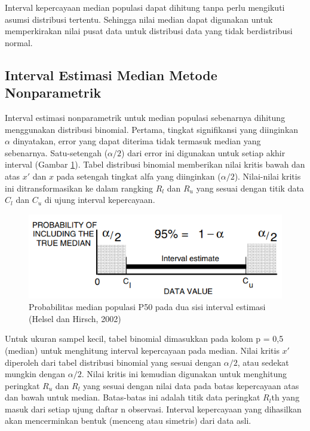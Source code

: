 \documentclass[]{book}
\begin{document}
Interval kepercayaan median populasi dapat dihitung tanpa perlu
mengikuti asumsi distribusi tertentu. Sehingga nilai median dapat
digunakan untuk memperkirakan nilai pusat data untuk distribusi data
yang tidak berdistribusi normal.

\subsection{Interval Estimasi Median Metode
Nonparametrik}\label{interval-estimasi-median-metode-nonparametrik}

Interval estimasi nonparametrik untuk median populasi sebenarnya
dihitung menggunakan distribusi binomial. Pertama, tingkat signifikansi
yang diinginkan \(\alpha\) dinyatakan, error yang dapat diterima tidak
termasuk median yang sebenarnya. Satu-setengah (\(\alpha/2\)) dari error
ini digunakan untuk setiap akhir interval (Gambar \ref{fig:iemednp}).
Tabel distribusi binomial memberikan nilai kritis bawah dan atas \(x'\)
dan \(x\) pada setengah tingkat alfa yang diinginkan (\(\alpha/2\)).
Nilai-nilai kritis ini ditransformasikan ke dalam rangking \(R_l\) dan
\(R_u\) yang sesuai dengan titik data \(C_l\) dan \(C_u\) di ujung
interval kepercayaan.

\begin{figure}

{\centering \includegraphics[width=0.65\linewidth]{iemednp} 

}

\caption{Probabilitas median populasi P50 pada dua sisi interval estimasi (Helsel dan Hirsch, 2002)}\label{fig:iemednp}
\end{figure}

Untuk ukuran sampel kecil, tabel binomial dimasukkan pada kolom p = 0,5
(median) untuk menghitung interval kepercayaan pada median. Nilai kritis
\(x'\) diperoleh dari tabel distribusi binomial yang sesuai dengan
\(\alpha/2\), atau sedekat mungkin dengan \(\alpha/2\). Nilai kritis ini
kemudian digunakan untuk menghitung peringkat \(R_u\) dan \(R_l\) yang
sesuai dengan nilai data pada batas kepercayaan atas dan bawah untuk
median. Batas-batas ini adalah titik data peringkat \(R_l\)th yang masuk
dari setiap ujung daftar n observasi. Interval kepercayaan yang
dihasilkan akan mencerminkan bentuk (menceng atau simetris) dari data
asli.
\end{document}
